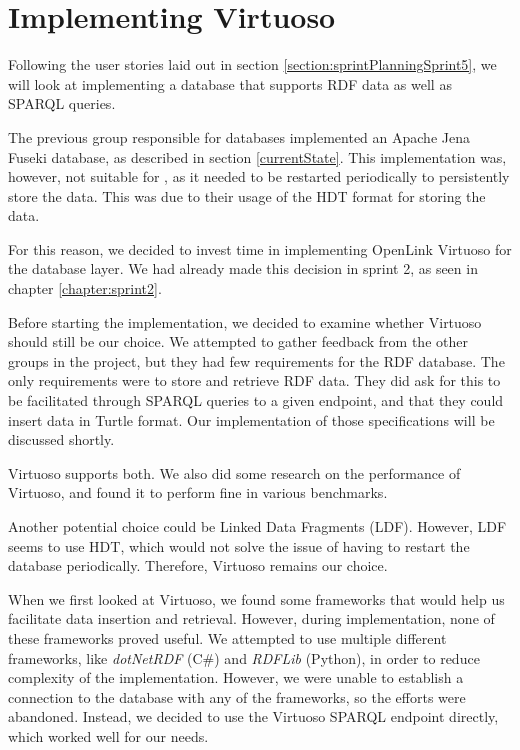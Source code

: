 \section{Implementing Virtuoso}\label{sec:implementing_virtuoso}
Following the user stories laid out in section \ref{section:sprintPlanningSprint5}, we will look at implementing a database that supports RDF data as well as SPARQL queries.

The previous group responsible for \knox{} databases implemented an Apache Jena Fuseki database, as described in section \ref{currentState}.
This implementation was, however, not suitable for \knox{}, as it needed to be restarted periodically to persistently store the data. This was due to their usage of the HDT format for storing the data\cite{knox2020}.

For this reason, we decided to invest time in implementing OpenLink Virtuoso\cite{OpenLinkSoftwareVirtuoso} for the \knox{} database layer. We had already made this decision in sprint 2, as seen in chapter \ref{chapter:sprint2}.

Before starting the implementation, we decided to examine whether Virtuoso should still be our choice.
We attempted to gather feedback from the other groups in the \knox{} project, but they had few requirements for the RDF database. The only requirements were to store and retrieve RDF data.
They did ask for this to be facilitated through SPARQL queries to a given endpoint, and that they could insert data in Turtle format. Our implementation of those specifications will be discussed shortly.

Virtuoso supports both. We also did some research on the performance of Virtuoso, and found it to perform fine in various benchmarks\cite{addleseeComparingLinkedData2019}\cite{jovanovikBenchmarkingVirtuosoMighty2018}.

Another potential choice could be Linked Data Fragments (LDF). However, LDF seems to use HDT\cite{HostServerTriple}, which would not solve the issue of having to restart the database periodically. Therefore, Virtuoso remains our choice.

When we first looked at Virtuoso, we found some frameworks that would help us facilitate data insertion and retrieval.  However, during implementation, none of these frameworks proved useful. We attempted to use multiple different frameworks, like \textit{dotNetRDF} (C\#) and \textit{RDFLib} (Python), in order to reduce complexity of the implementation. However, we were unable to establish a connection to the database with any of the frameworks, so the efforts were abandoned. Instead, we decided to use the Virtuoso SPARQL endpoint directly, which worked well for our needs.

